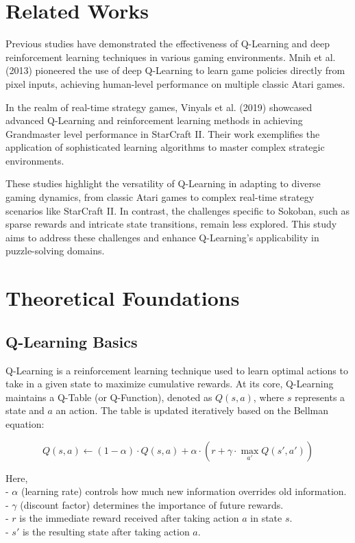 \documentclass[10pt,twocolumn]{article}
\begin{document}
\section{Related Works}

Previous studies have demonstrated the effectiveness of Q-Learning and deep reinforcement learning techniques in various gaming environments. Mnih et al. (2013) pioneered the use of deep Q-Learning to learn game policies directly from pixel inputs, achieving human-level performance on multiple classic Atari games.

In the realm of real-time strategy games, Vinyals et al. (2019) showcased advanced Q-Learning and reinforcement learning methods in achieving Grandmaster level performance in StarCraft II. Their work exemplifies the application of sophisticated learning algorithms to master complex strategic environments.

These studies highlight the versatility of Q-Learning in adapting to diverse gaming dynamics, from classic Atari games to complex real-time strategy scenarios like StarCraft II. In contrast, the challenges specific to Sokoban, such as sparse rewards and intricate state transitions, remain less explored. This study aims to address these challenges and enhance Q-Learning's applicability in puzzle-solving domains.

\section{Theoretical Foundations}

\subsection{Q-Learning Basics}

Q-Learning is a reinforcement learning technique used to learn optimal actions to take in a given state to maximize cumulative rewards. At its core, Q-Learning maintains a Q-Table (or Q-Function), denoted as \( Q(s, a) \), where \( s \) represents a state and \( a \) an action. The table is updated iteratively based on the Bellman equation:

\[
    Q(s, a) \leftarrow (1 - \alpha) \cdot Q(s, a) + \alpha \cdot \left( r + \gamma \cdot \max_{a'} Q(s', a') \right)
\]

Here, \\
- \( \alpha \) (learning rate) controls how much new information overrides old information. \\
- \( \gamma \) (discount factor) determines the importance of future rewards. \\
- \( r \) is the immediate reward received after taking action \( a \) in state \( s \). \\
- \( s' \) is the resulting state after taking action \( a \). \\
\end{document}

